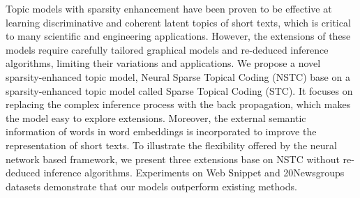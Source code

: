 Topic models with sparsity enhancement have been proven to be effective at learning discriminative and coherent latent topics of short texts, which is critical to many scientific and engineering applications. However, the extensions of these models require carefully tailored graphical models and re-deduced inference algorithms, limiting their variations and applications. We propose a novel sparsity-enhanced topic model, Neural Sparse Topical Coding (NSTC) base on a sparsity-enhanced topic model called Sparse Topical Coding (STC). It focuses on replacing the complex inference process with the back propagation, which makes the model easy to explore extensions. Moreover, the external semantic information of words in word embeddings is incorporated to improve the representation of short texts. To illustrate the flexibility offered by the neural network based framework, we present three extensions base on NSTC without re-deduced inference algorithms. Experiments on Web Snippet and 20Newsgroups datasets demonstrate that our models outperform existing methods.
